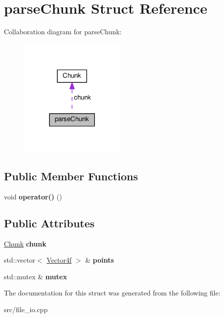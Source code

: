\hypertarget{structparseChunk}{}\section{parse\+Chunk Struct Reference}
\label{structparseChunk}


Collaboration diagram for parse\+Chunk\+:
\nopagebreak
\begin{figure}[H]
\begin{center}
\leavevmode
\includegraphics[width=149pt]{structparseChunk__coll__graph}
\end{center}
\end{figure}
\subsection*{Public Member Functions}
\begin{DoxyCompactItemize}
\item 
\mbox{\label{structparseChunk_a5aec7c42eb0c0f9fdaa77b879a378019}} 
void {\bfseries operator()} ()
\end{DoxyCompactItemize}
\subsection*{Public Attributes}
\begin{DoxyCompactItemize}
\item 
\mbox{\label{structparseChunk_ab6b37da3ce4329fff11e7d8b59fb757e}} 
\hyperlink{structChunk}{Chunk} {\bfseries chunk}
\item 
\mbox{\label{structparseChunk_a5ff5c249a458d01403c0c5b47bb34075}} 
std\+::vector$<$ \hyperlink{structVector}{Vector4f} $>$ \& {\bfseries points}
\item 
\mbox{\label{structparseChunk_ac93f102703e2e73a594d23a4dcc19d06}} 
std\+::mutex \& {\bfseries mutex}
\end{DoxyCompactItemize}


The documentation for this struct was generated from the following file\+:\begin{DoxyCompactItemize}
\item 
src/file\+\_\+io.\+cpp\end{DoxyCompactItemize}
